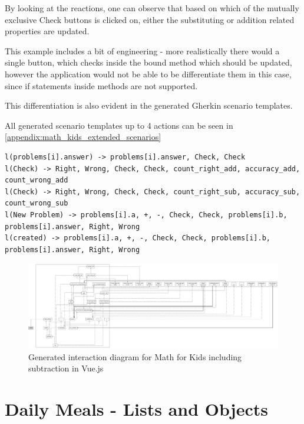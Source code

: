 By looking at the reactions, one can observe that based on which of the mutually exclusive Check buttons is clicked on, either the substituting or addition related properties are updated. 

This example includes a bit of engineering - more realistically there would a single button, which checks inside the bound method which should be updated, however the application would not be able to be differentiate them in this case, since if statements inside methods are not supported.

This differentiation is also evident in the generated Gherkin scenario templates. 

All generated scenario templates up to 4 actions can be seen in  \ref{appendix:math_kids_extended_scenarios}

\begin{lstlisting}
l(problems[i].answer) -> problems[i].answer, Check, Check
l(Check) -> Right, Wrong, Check, Check, count_right_add, accuracy_add, count_wrong_add
l(Check) -> Right, Wrong, Check, Check, count_right_sub, accuracy_sub, count_wrong_sub
l(New Problem) -> problems[i].a, +, -, Check, Check, problems[i].b, problems[i].answer, Right, Wrong
l(created) -> problems[i].a, +, -, Check, Check, problems[i].b, problems[i].answer, Right, Wrong
\end{lstlisting}

\begin{figure}[H]
    \includegraphics[width=\textwidth]{images/diagram_list_add_sub.png}
     \caption{Generated interaction diagram for Math for Kids including subtraction in Vue.js}
     \label{fig:diagram_list_complex}
\end{figure}






\section{Daily Meals - Lists and Objects}

